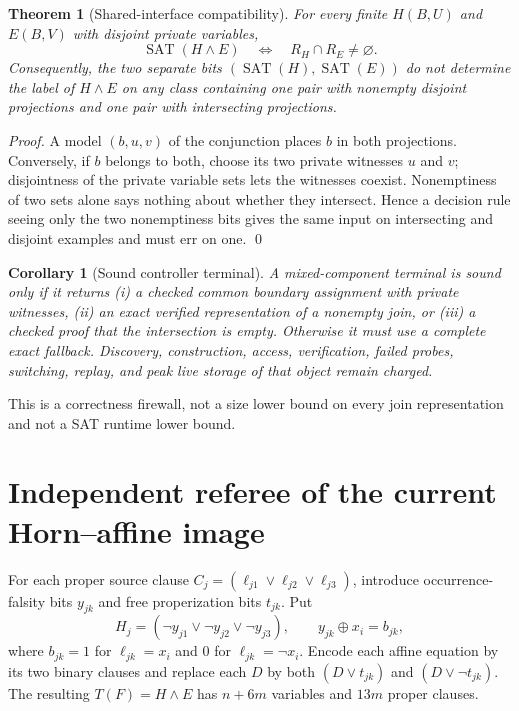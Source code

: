 \documentclass[11pt]{article}
\newtheorem{theorem}{Theorem}
\newtheorem{corollary}{Corollary}
\begin{document}
\begin{theorem}[Shared-interface compatibility]
For every finite $H(B,U)$ and $E(B,V)$ with disjoint private variables,
\[
 \operatorname{SAT}(H\wedge E)
 \quad\Longleftrightarrow\quad R_H\cap R_E\ne\varnothing.
\]
Consequently, the two separate bits
$(\operatorname{SAT}(H),\operatorname{SAT}(E))$ do not determine the label of
$H\wedge E$ on any class containing one pair with nonempty disjoint projections
and one pair with intersecting projections.
\end{theorem}
\begin{proof}
A model $(b,u,v)$ of the conjunction places $b$ in both projections.  Conversely,
if $b$ belongs to both, choose its two private witnesses $u$ and $v$; disjointness
of the private variable sets lets the witnesses coexist.  Nonemptiness of two
sets alone says nothing about whether they intersect.  Hence a decision rule
seeing only the two nonemptiness bits gives the same input on intersecting and
disjoint examples and must err on one. \qed
\end{proof}

\begin{corollary}[Sound controller terminal]
A mixed-component terminal is sound only if it returns (i) a checked common
boundary assignment with private witnesses, (ii) an exact verified representation
of a nonempty join, or (iii) a checked proof that the intersection is empty.
Otherwise it must use a complete exact fallback.  Discovery, construction,
access, verification, failed probes, switching, replay, and peak live storage of
that object remain charged.
\end{corollary}
This is a correctness firewall, not a size lower bound on every join
representation and not a SAT runtime lower bound.

\section{Independent referee of the current Horn--affine image}
For each proper source clause
$C_j=(\ell_{j1}\vee\ell_{j2}\vee\ell_{j3})$, introduce occurrence-falsity
bits $y_{jk}$ and free properization bits $t_{jk}$.  Put
\[
 H_j=(\neg y_{j1}\vee\neg y_{j2}\vee\neg y_{j3}),\qquad
 y_{jk}\oplus x_i=b_{jk},
\]
where $b_{jk}=1$ for $\ell_{jk}=x_i$ and $0$ for
$\ell_{jk}=\neg x_i$.  Encode each affine equation by its two binary clauses
and replace each $D$ by both $(D\vee t_{jk})$ and
$(D\vee\neg t_{jk})$.  The resulting $T(F)=H\wedge E$ has $n+6m$ variables
and $13m$ proper clauses.
\end{document}
